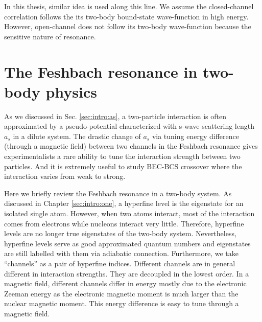 In this thesis, similar idea is used along this line.  We assume the closed-channel correlation follows the its two-body bound-state wave-function in high energy.   However, open-channel does not follow its two-body  wave-function because the sensitive nature of resonance. 
 
 
 \chapter{The  Feshbach resonance in two-body physics\label{sec:intro:twobody}}
 As we discussed in Sec. \ref{sec:intro:as}, a two-particle interaction is often approximated by a pseudo-potential characterized with s-wave scattering length $a_{s}$ in a dilute system.   The drastic  change  of $a_{s}$  via tuning energy difference (through a magnetic field) between two channels in the Feshbach resonance gives  experimentalists a rare ability to tune the interaction strength between two particles.  And it is extremely useful to study BEC-BCS crossover where the interaction varies from weak to strong.  
 
Here we briefly review the Feshbach resonance in a two-body system.   As discussed in Chapter \ref{sec:intro:one}, a hyperfine level is the eigenstate for an isolated single atom.  However, when two atoms interact, most of the interaction comes from  electrons while nucleons interact very little.  Therefore, hyperfine levels are no longer true eigenstates of the two-body system.  Nevertheless, hyperfine levels serve as  good approximated quantum numbers and eigenstates are still labelled with them via adiabatic connection. Furthermore, we take ``channels'' as a pair of hyperfine indices.  Different channels are in general different in interaction strengths.  They are decoupled in the lowest order.  In a magnetic field, different channels differ in energy mostly due to the electronic Zeeman energy  as the electronic magnetic moment is much larger than the nuclear magnetic moment.  This energy difference is easy to tune through a magnetic field.  

